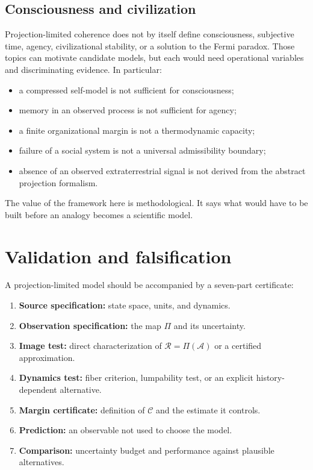 \documentclass[11pt]{article}
\newcommand{\A}{\mathcal A}
\newcommand{\Rset}{\mathcal R}
\newcommand{\Ccap}{\mathcal C}
\begin{document}
\subsection{Consciousness and civilization}

Projection-limited coherence does not by itself define consciousness,
subjective time, agency, civilizational stability, or a solution to the
Fermi paradox.  Those topics can motivate candidate models, but each would
need operational variables and discriminating evidence.  In particular:
\begin{itemize}
\item a compressed self-model is not sufficient for consciousness;
\item memory in an observed process is not sufficient for agency;
\item a finite organizational margin is not a thermodynamic capacity;
\item failure of a social system is not a universal admissibility boundary;
\item absence of an observed extraterrestrial signal is not derived from
the abstract projection formalism.
\end{itemize}
The value of the framework here is methodological.  It says what would have
to be built before an analogy becomes a scientific model.

\section{Validation and falsification}

A projection-limited model should be accompanied by a seven-part
certificate:
\begin{enumerate}
\item \textbf{Source specification:} state space, units, and dynamics.
\item \textbf{Observation specification:} the map $\Pi$ and its uncertainty.
\item \textbf{Image test:} direct characterization of $\Rset=\Pi(\A)$ or a
certified approximation.
\item \textbf{Dynamics test:} fiber criterion, lumpability test, or an
explicit history-dependent alternative.
\item \textbf{Margin certificate:} definition of $\Ccap$ and the estimate it
controls.
\item \textbf{Prediction:} an observable not used to choose the model.
\item \textbf{Comparison:} uncertainty budget and performance against
plausible alternatives.
\end{enumerate}
\end{document}
